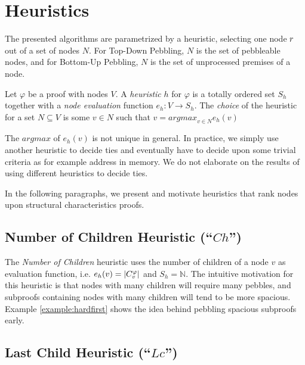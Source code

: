 \section{Heuristics}
\label{sec:heuristics}

The presented algorithms are parametrized by a heuristic, selecting one node $r$ out of a set of nodes $N$.
For Top-Down Pebbling, $N$ is the set of pebbleable nodes, and for Bottom-Up Pebbling, $N$ is the set of unprocessed premises of a node. 

\begin{definition}[Heuristic]

Let $\varphi$ be a proof with nodes $V$.
A \emph{heuristic} $h$ for $\varphi$ is a totally ordered set $S_h$ together with a \emph{node evaluation} function $e_h: V \rightarrow S_h$.
The \emph{choice} of the heuristic for a set $N \subseteq V$ is some $v \in N$ such that $v = \mathit{argmax}_{v \in N} e_h(v)$
\end{definition}

The $\mathit{argmax}$ of $e_h(v)$ is not unique in general.
In practice, we simply use another heuristic to decide ties and eventually have to decide upon some trivial criteria as for example address in memory.
We do not elaborate on the results of using different heuristics to decide ties.

In the following paragraphs, we present and motivate heuristics that rank nodes upon structural characteristics proofs.

\subsection{Number of Children Heuristic (``$Ch$'')}
\label{sec:children}
The \emph{Number of Children} heuristic uses the number of children of a node $v$ as evaluation function, i.e. $e_h(v) = |C_{v}^{\varphi}|$ and $S_h = \mathbb{N}$.
The intuitive motivation for this heuristic is that nodes with many children will require many pebbles, and subproofs containing nodes with many children will tend to be more spacious.
Example \ref{example:hardfirst} shows the idea behind pebbling spacious subproofs early.

\subsection{Last Child Heuristic (``$Lc$'')}
\label{sec:lastchild}

